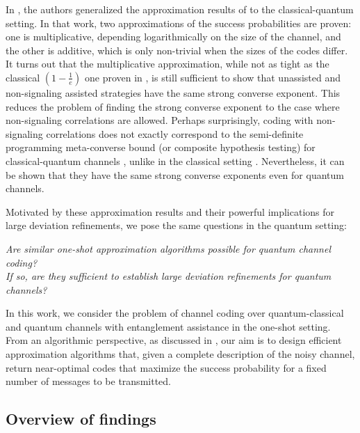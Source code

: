 \documentclass[a4paper,onecolumn,11pt,accepted=2025-10-01]{quantumarticle}
\begin{document}
In \cite{Fawzi19}, the authors generalized the approximation results of \cite{barman2017algorithmic} to the classical-quantum setting. In that work, two approximations of the success probabilities are proven: one is multiplicative, depending logarithmically on the size of the channel, and the other is additive, which is only non-trivial when the sizes of the codes differ. It turns out that the multiplicative approximation, while not as tight as the classical $(1 - \frac{1}{e})$ one proven in \cite{barman2017algorithmic},  is still sufficient to show that unassisted and non-signaling assisted strategies have the same strong converse exponent. This reduces the problem of finding the strong converse exponent to the case where non-signaling correlations are allowed. Perhaps surprisingly, coding with non-signaling correlations does not exactly correspond to the semi-definite programming meta-converse bound (or composite hypothesis testing) for classical-quantum channels \cite{Matthews2014Sep,Wang2019Feb}, unlike in the classical setting \cite{matthews2012linear}. Nevertheless, it can be shown that they have the same strong converse exponents even for quantum channels.

Motivated by these approximation results and their powerful implications for large deviation refinements, we pose the same questions in the quantum setting: 
\begin{center}
    \emph{Are similar one-shot approximation algorithms possible for quantum channel coding?}
    \\ \emph{If so, are they sufficient to establish large deviation refinements for quantum channels?}
\end{center}
In this work, we consider the problem of channel coding over quantum-classical and quantum channels with entanglement assistance in the one-shot setting. From an algorithmic perspective, as discussed in \cite{barman2017algorithmic,Fawzi19,fawzi2023multiple,fawzi2023broadcast,berta2024optimality}, our aim is to design efficient approximation algorithms that, given a complete description of the noisy channel, return near-optimal codes that maximize the success probability for a fixed number of messages to be transmitted.


\subsection{Overview of findings}
\end{document}
